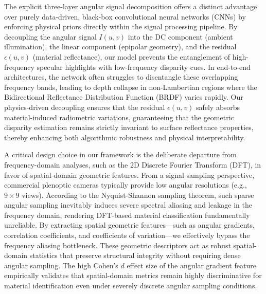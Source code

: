 The explicit three-layer angular signal decomposition offers a distinct advantage over purely data-driven, black-box convolutional neural networks (CNNs) by enforcing physical priors directly within the signal processing pipeline. By decoupling the angular signal $I(u,v)$ into the DC component (ambient illumination), the linear component (epipolar geometry), and the residual $\epsilon(u,v)$ (material reflectance), our model prevents the entanglement of high-frequency specular highlights with low-frequency disparity cues. In end-to-end architectures, the network often struggles to disentangle these overlapping frequency bands, leading to depth collapse in non-Lambertian regions where the Bidirectional Reflectance Distribution Function (BRDF) varies rapidly. Our physics-driven decoupling ensures that the residual $\epsilon(u,v)$ safely absorbs material-induced radiometric variations, guaranteeing that the geometric disparity estimation remains strictly invariant to surface reflectance properties, thereby enhancing both algorithmic robustness and physical interpretability.

A critical design choice in our framework is the deliberate departure from frequency-domain analyses, such as the 2D Discrete Fourier Transform (DFT), in favor of spatial-domain geometric features. From a signal sampling perspective, commercial plenoptic cameras typically provide low angular resolutions (e.g., $9 \times 9$ views). According to the Nyquist-Shannon sampling theorem, such sparse angular sampling inevitably induces severe spectral aliasing and leakage in the frequency domain, rendering DFT-based material classification fundamentally unreliable. By extracting spatial geometric features—such as angular gradients, correlation coefficients, and coefficients of variation—we effectively bypass the frequency aliasing bottleneck. These geometric descriptors act as robust spatial-domain statistics that preserve structural integrity without requiring dense angular sampling. The high Cohen's $d$ effect size of the angular gradient feature empirically validates that spatial-domain metrics remain highly discriminative for material identification even under severely discrete angular sampling conditions.


